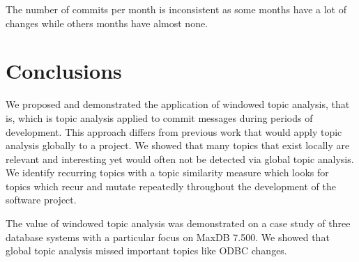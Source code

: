 \documentclass[times, 10pt,twocolumn]{article}
\newcommand{\shrinkit}{\vspace*{-.3em}}
\begin{document}
The number of commits per month is inconsistent as some months have a
lot of changes while others months have almost none.




\shrinkit
\section{Conclusions}
\shrinkit












We proposed and demonstrated the application of windowed topic
analysis, that is, which is topic analysis applied to commit messages during
periods of development. This approach differs from previous work that
would apply topic analysis globally to a project. We showed that many
topics that exist locally are relevant and interesting yet would often
not be detected via global topic analysis. We identify recurring topics
with a topic similarity measure which looks for topics which recur and
mutate repeatedly throughout the development of the software project.

The value of windowed topic analysis was demonstrated on a case study
of three database systems with a particular focus on MaxDB 7.500. We
showed that global topic analysis missed important topics like ODBC
changes.
\end{document}
